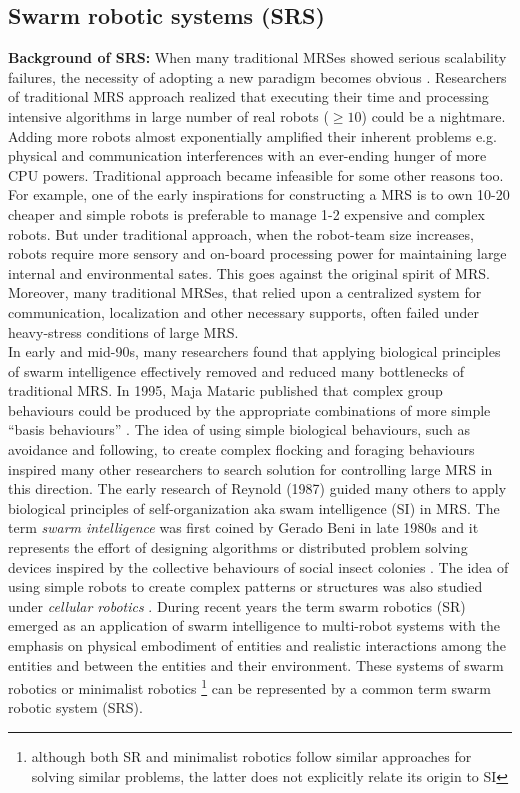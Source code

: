 \subsection{Swarm robotic systems (SRS)}
\label{bg:mrs:srs}
\textbf{Background of SRS:} When many traditional MRSes showed serious  scalability failures, the necessity of adopting a  new paradigm becomes obvious \cite{Lerman+2006}. Researchers of traditional MRS approach realized  that  executing their time and processing intensive algorithms in large number of real robots ($\geq 10$) could be a nightmare. Adding more robots almost exponentially amplified their inherent  problems e.g. physical and communication interferences with an ever-ending hunger of more CPU powers. Traditional approach became infeasible for some other reasons too. For example, one of the early inspirations for constructing a MRS is to own 10-20 cheaper and simple robots is preferable to manage 1-2 expensive and complex robots. But under traditional approach, when the robot-team size increases,  robots require more sensory and on-board processing power for maintaining large internal and environmental sates. This goes against the original spirit of MRS. Moreover, many traditional MRSes, that relied upon a centralized system for communication, localization and other necessary supports,  often failed under heavy-stress conditions of large MRS.\\
In early and mid-90s, many researchers found that applying biological principles of swarm intelligence effectively removed and reduced many bottlenecks of traditional MRS.  In 1995, Maja Mataric published that complex group behaviours could be produced by the appropriate combinations of more simple ``basis behaviours'' \cite{Mataric1995}. The idea of using simple biological behaviours, such as avoidance and following, to create complex flocking and foraging behaviours inspired many other researchers to search solution for controlling large MRS in this direction.  The early research of Reynold (1987) guided many others to apply biological principles of self-organization aka swam intelligence (SI) in MRS.  The term {\em swarm intelligence} was first coined by Gerado Beni \cite{Beni2005} in late 1980s and it represents the effort of designing algorithms or distributed problem solving devices inspired by the collective behaviours of social insect colonies \cite{Bonabeau+1999}. The idea of using simple robots to create complex patterns or structures was also studied under {\em cellular robotics} \cite{Fukuda+1987}. During recent years the term swarm robotics (SR) emerged as an application of swarm intelligence to multi-robot systems with the emphasis on physical embodiment of entities and realistic interactions among the entities and between the entities and their environment. These systems of swarm robotics or minimalist robotics \footnote{although both SR and minimalist robotics follow similar approaches for solving similar problems, the latter does not explicitly relate its origin to SI} can be represented by a common term swarm robotic system (SRS).\\
